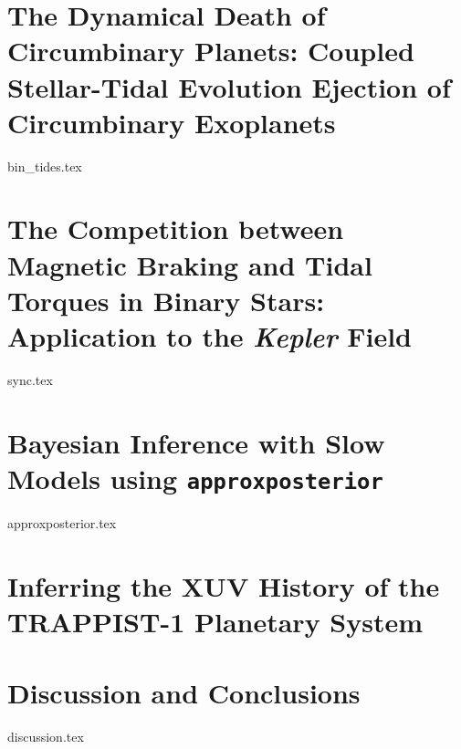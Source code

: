\documentclass [11pt, proquest]{uwthesis}[2016/11/22] %
\newcommand{\approxposterior}[0]{\texttt{approxposterior}\xspace}
\newcommand{\kepler}[0]{\textit{Kepler}\xspace}
\begin{document}
\chapter{The Dynamical Death of Circumbinary Planets: Coupled Stellar-Tidal Evolution Ejection of Circumbinary Exoplanets}
{bin_tides.tex}

\chapter{The Competition between Magnetic Braking and Tidal Torques in Binary Stars: Application to the \kepler Field}
{sync.tex}

\chapter{Bayesian Inference with Slow Models using \approxposterior}
{approxposterior.tex}

\chapter{Inferring the XUV History of the TRAPPIST-1 Planetary System}

\chapter{Discussion and Conclusions}
{discussion.tex}

\printendnotes

%
%

%
%

\appendix
\raggedbottom\sloppy
\end{document}
